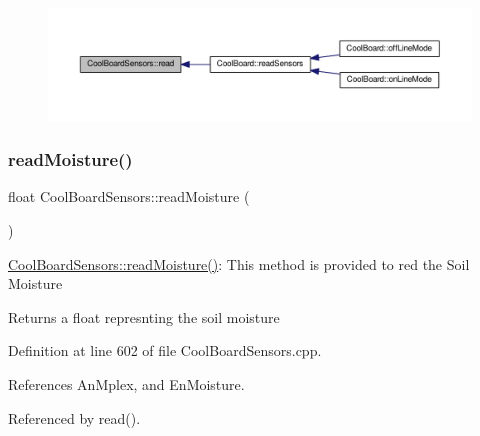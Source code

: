 \begin{figure}[H]
\begin{center}
\leavevmode
\includegraphics[width=350pt]{classCoolBoardSensors_a91badb2539d91fda8679f2a597874c48_icgraph}
\end{center}
\end{figure}
\mbox{\label{classCoolBoardSensors_a8761bff50373c485f4465c8db47d0633}} 
\subsubsection{\texorpdfstring{read\+Moisture()}{readMoisture()}}
{\footnotesize\ttfamily float Cool\+Board\+Sensors\+::read\+Moisture (\begin{DoxyParamCaption}{ }\end{DoxyParamCaption})}

\hyperlink{classCoolBoardSensors_a8761bff50373c485f4465c8db47d0633}{Cool\+Board\+Sensors\+::read\+Moisture()}\+: This method is provided to red the Soil Moisture

\begin{DoxyReturn}{Returns}
a float represnting the soil moisture 
\end{DoxyReturn}


Definition at line 602 of file Cool\+Board\+Sensors.\+cpp.



References An\+Mplex, and En\+Moisture.



Referenced by read().


